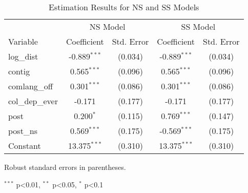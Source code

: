 
\begin{table}[H]
    \centering
    \begin{threeparttable}
        \begin{tabular}{lcccc}
            \toprule
            & \multicolumn{2}{c}{NS Model} & \multicolumn{2}{c}{SS Model} \\
            \cmidrule(lr){2-3} \cmidrule(lr){4-5}
            Variable & Coefficient & Std. Error & Coefficient & Std. Error \\
            \midrule
            log\_dist & -0.889$^{\ast\ast\ast}$ & (0.034) & -0.889$^{\ast\ast\ast}$ & (0.034) \\
            contig & 0.565$^{\ast\ast\ast}$ & (0.096) & 0.565$^{\ast\ast\ast}$ & (0.096) \\
            comlang\_off & 0.301$^{\ast\ast\ast}$ & (0.086) & 0.301$^{\ast\ast\ast}$ & (0.086) \\
            col\_dep\_ever & -0.171 & (0.177) & -0.171 & (0.177) \\
            post & 0.200$^{\ast}$ & (0.115) & 0.769$^{\ast\ast\ast}$ & (0.147) \\
            post\_ns & 0.569$^{\ast\ast\ast}$ & (0.175) & -0.569$^{\ast\ast\ast}$ & (0.175) \\
            Constant & 13.375$^{\ast\ast\ast}$ & (0.310) & 13.375$^{\ast\ast\ast}$ & (0.310) \\
            \bottomrule
        \end{tabular}
        \begin{tablenotes}
            \footnotesize
            \item Robust standard errors in parentheses.
            \item $^{\ast\ast\ast}$ p<0.01, $^{\ast\ast}$ p<0.05, $^{\ast}$ p<0.1
        \end{tablenotes}
    \end{threeparttable}
    \caption{Estimation Results for NS and SS Models}
    \label{tab:ns_ss_post_model}
\end{table}
